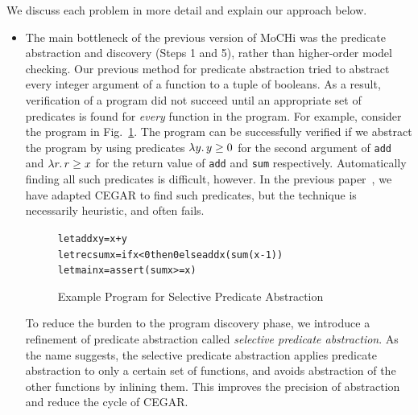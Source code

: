 We discuss each problem in more detail and explain our approach below.

\begin{itemize}
\item
The main bottleneck of the previous version of MoCHi was the predicate
abstraction and discovery (Steps 1 and 5), rather than higher-order
model checking. Our previous method for predicate abstraction tried to
abstract every integer argument of a function to a tuple of booleans. As
a result, verification of a program did not succeed until an appropriate
set of predicates is found for \emph{every} function in the program.
For example, consider the program in Fig.~\ref{fig:abst-example}.  The
program can be successfully verified if we abstract the program by using
predicates $\lambda{y}.\,{y\geq0}$ for the second argument of \texttt{add} and
$\lambda{r}.\,{r\geq x}$ for the return value of \texttt{add} and \texttt{sum} respectively.
Automatically finding all such predicates is difficult, however.  In the
previous paper~\cite{KobayashiPLDI2011}, we have adapted CEGAR to find
such predicates, but the technique is necessarily heuristic, and often
fails.

\begin{figure}[t]
\begin{alltt}
let add x y = x + y
let rec sum x = if x < 0 then 0 else add x (sum (x-1))
let main x = assert (sum x >= x)
\end{alltt}
\caption{Example Program for Selective Predicate Abstraction}
\label{fig:abst-example}
\end{figure}


To reduce the burden to the program discovery phase, we introduce a refinement
of predicate abstraction called \emph{selective predicate abstraction}.
As the name suggests, the selective predicate abstraction applies
predicate abstraction to only a certain set of functions, and avoids
abstraction of the other functions by inlining them.
This improves the precision of abstraction and reduce the cycle of CEGAR.


\end{itemize}
